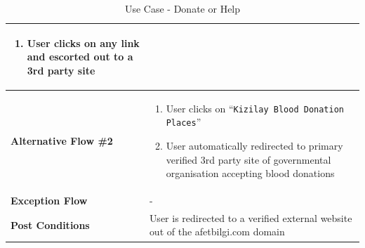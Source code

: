 \begin{table}[H]
\begin{tabular}{|p{.3\linewidth}|p{.7\linewidth}|}
\begin{minipage}[ht]{\linewidth}
\begin{enumerate}[label=\textbf{Step \arabic*:},leftmargin=1.5\leftmargin]
                \item User clicks on any link and escorted out to a 3rd party site
            \end{enumerate}
        \end{minipage} \\
    \hline
    \textbf{Alternative Flow \#2} &
    \begin{minipage}[ht]{\linewidth} 
            \begin{enumerate}[label=\textbf{Step \arabic*:},leftmargin=1.5\leftmargin]
                \item User clicks on ``\texttt{Kizilay Blood Donation Places}''
                \item User automatically redirected to primary verified 3rd party site of governmental organisation accepting blood donations
            \end{enumerate}
        \end{minipage} \\
    \hline
    \textbf{Exception Flow} & - \\
    \hline
    \textbf{Post Conditions} & User is redirected to a verified external website out of the afetbilgi.com domain \\
    \hline
  \end{tabular}
  \caption{Use Case - Donate or Help}
\end{table}

